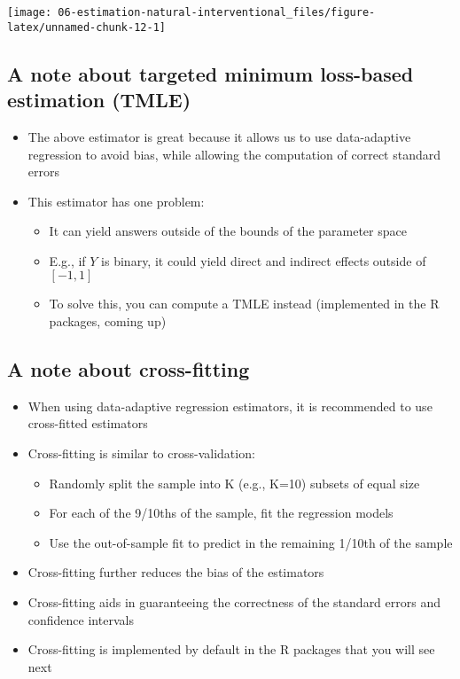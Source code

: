 \documentclass[
  12pt,
]{book}
\providecommand{\tightlist}{%
  \setlength{\itemsep}{0pt}\setlength{\parskip}{0pt}}
\theoremstyle{definition}
\theoremstyle{definition}
\theoremstyle{definition}
\newcommand{\1}{\mathbbm{1}}
\begin{document}
\begin{center}\texttt{[image: 06-estimation-natural-interventional\_files/figure-latex/unnamed-chunk-12-1]} \end{center}

\hypertarget{a-note-about-targeted-minimum-loss-based-estimation-tmle}{%
\subsection{A note about targeted minimum loss-based estimation (TMLE)}\label{a-note-about-targeted-minimum-loss-based-estimation-tmle}}

\begin{itemize}
\tightlist
\item
  The above estimator is great because it allows us to use data-adaptive regression to avoid bias, while allowing the computation of correct standard errors
\item
  This estimator has one problem:

  \begin{itemize}
  \tightlist
  \item
    It can yield answers outside of the bounds of the parameter space
  \item
    E.g., if \(Y\) is binary, it could yield direct and indirect effects outside of \([-1,1]\)
  \item
    To solve this, you can compute a TMLE instead (implemented in the R packages, coming up)
  \end{itemize}
\end{itemize}

\hypertarget{a-note-about-cross-fitting}{%
\subsection{A note about cross-fitting}\label{a-note-about-cross-fitting}}

\begin{itemize}
\tightlist
\item
  When using data-adaptive regression estimators, it is recommended to use cross-fitted estimators
\item
  Cross-fitting is similar to cross-validation:

  \begin{itemize}
  \tightlist
  \item
    Randomly split the sample into K (e.g., K=10) subsets of equal size
  \item
    For each of the 9/10ths of the sample, fit the regression models
  \item
    Use the out-of-sample fit to predict in the remaining 1/10th of the sample
  \end{itemize}
\item
  Cross-fitting further reduces the bias of the estimators
\item
  Cross-fitting aids in guaranteeing the correctness of the standard errors and confidence intervals
\item
  Cross-fitting is implemented by default in the R packages that you will see next
\end{itemize}
\end{document}
